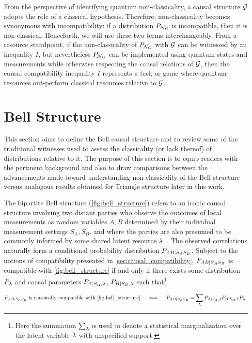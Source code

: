 \documentclass[aps, 10pt, english, twoside, pra, nofootinbib, tightenlines, longbibliography, superscriptaddress]{revtex4-1}
\begin{document}
    From the perspective of identifying quantum non-classicality, a causal structure $\mathcal{G}$ adopts the role of a classical hypothesis. Therefore, non-classicality becomes synonymous with incompatibility: if a distribution $\prob[\nodes_{O}]$ is incompatible, then it is non-classical. Henceforth, we will use these two terms interchangeably. From a resource standpoint, if the non-classicality of $\prob[\nodes_{O}]$ with $\mathcal{G}$ can be witnessed by an inequality $I$, but nevertheless $\prob[\nodes_{O}]$ can be implemented using quantum states and measurements while otherwise respecting the causal relations of $\mathcal{G}$, then the causal compatibility inequality $I$ represents a task or game where quantum resources out-perform classical resources relative to $\mathcal{G}$.

    \section{Bell Structure}
    \label{sec:bell_structure}
    This section aims to define the Bell causal structure and to review some of the traditional witnesses used to assess the classicality (or lack thereof) of distributions relative to it. The purpose of this section is to equip readers with the pertinent background and also to draw comparisons between the advancements made toward understanding non-classicality of the Bell structure versus analogous results obtained for Triangle structure later in this work.

    The bipartite Bell structure (\cref{fig:bell_structure}) refers to an iconic causal structure involving two distant parties who observe the outcomes of local measurements as random variables $A,B$ determined by their individual measurement settings $S_A,S_B$, and where the parties are also presumed to be commonly informed by some shared latent resource $\lambda$~\cite{Brunner_2013}. The observed correlations naturally form a conditional probability distribution $\prob[AB|S_AS_B]$. Subject to the notions of compatibility presented in \cref{sec:causal_compatibility}, $\prob[AB|S_AS_B]$ is compatible with \cref{fig:bell_structure} if and only if there exists some distribution $\prob[\la]$ and causal parameters $\prob[A|S_A,\la]$, $\prob[B|S_B,\la]$ such that\footnote{Here the summation $\sum_{\lambda}$ is used to denote a statistical marginalization over the latent variable $\lambda$ with unspecified support.}

    \begin{align}\label{eq:bellcompat}
     \prob[AB|S_AS_B] \text{ is classically compatible with \cref{fig:bell_structure}} \quad\iff \quad \prob[AB|S_AS_B] = \sum_{\la} \prob[A|S_A,\la]\prob[B|S_B,\la]\prob[\la]\,.
    \end{align}
\end{document}
